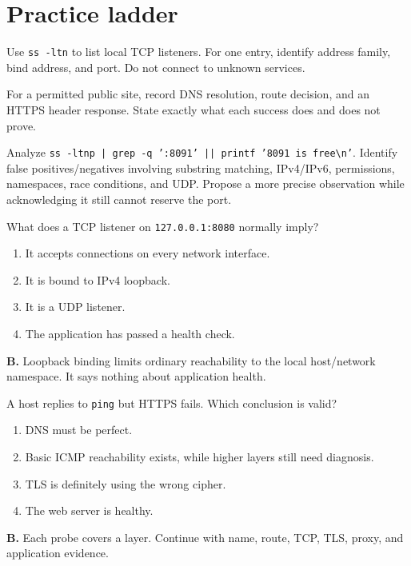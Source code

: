\documentclass[11pt,oneside,openany]{book}
\newcommand{\fourchoices}[4]{%
  \begin{enumerate}[label=\Alph*),leftmargin=2em,itemsep=0.25em]
    \item #1
    \item #2
    \item #3
    \item #4
  \end{enumerate}}
\begin{document}
\section{Practice ladder}
\begin{practicebox}[title={Easy -- local socket inventory}]
Use \texttt{ss -ltn} to list local TCP listeners. For one entry, identify address family, bind address, and port. Do not connect to unknown services.
\end{practicebox}
\begin{practicebox}[title={Medium -- layered test}]
For a permitted public site, record DNS resolution, route decision, and an HTTPS header response. State exactly what each success does and does not prove.
\end{practicebox}
\begin{practicebox}[title={Hard -- port 8091 analysis}]
Analyze \texttt{ss -ltnp | grep -q ':8091' || printf '8091 is free\textbackslash n'}. Identify false positives/negatives involving substring matching, IPv4/IPv6, permissions, namespaces, race conditions, and UDP. Propose a more precise observation while acknowledging it still cannot reserve the port.
\end{practicebox}

\begin{questionbox}[title={Medium 15.1 -- Listener scope}]
What does a TCP listener on \texttt{127.0.0.1:8080} normally imply?
\fourchoices{It accepts connections on every network interface.}{It is bound to IPv4 loopback.}{It is a UDP listener.}{The application has passed a health check.}
\end{questionbox}
\begin{answerbox}
\textbf{B.} Loopback binding limits ordinary reachability to the local host/network namespace. It says nothing about application health.
\end{answerbox}

\begin{questionbox}[title={Hard 15.2 -- Probe limits}]
A host replies to \texttt{ping} but HTTPS fails. Which conclusion is valid?
\fourchoices{DNS must be perfect.}{Basic ICMP reachability exists, while higher layers still need diagnosis.}{TLS is definitely using the wrong cipher.}{The web server is healthy.}
\end{questionbox}
\begin{answerbox}
\textbf{B.} Each probe covers a layer. Continue with name, route, TCP, TLS, proxy, and application evidence.
\end{answerbox}
\end{document}
